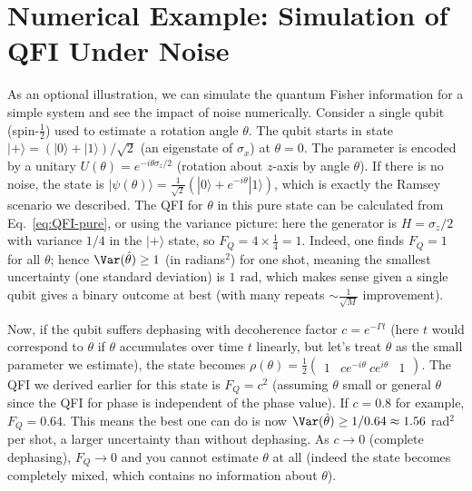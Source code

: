 \section{Numerical Example: Simulation of QFI Under Noise}

\label{sec:numerics}



As an optional illustration, we can simulate the quantum Fisher
information for a simple system and see the impact of noise
numerically. Consider a single qubit (spin-$\frac{1}{2}$) used to
estimate a rotation angle $\theta$. The qubit starts in state
$|+\rangle = (|0\rangle+|1\rangle)/\sqrt{2}$ (an eigenstate of
$\sigma_x$) at $\theta=0$. The parameter is encoded by a unitary
$U(\theta) = e^{-i \theta \sigma_z/2}$ (rotation about $z$-axis by
angle $\theta$). If there is no noise, the state is
$|\psi(\theta)\rangle = \frac{1}{\sqrt{2}}(|0\rangle +
e^{-i\theta}|1\rangle)$, which is exactly the Ramsey scenario we
described. The QFI for $\theta$ in this pure state can be calculated
from Eq.~\eqref{eq:QFI-pure}, or using the variance picture: here the
generator is $H=\sigma_z/2$ with variance $1/4$ in the $|+\rangle$
state, so $F_Q = 4 \times \frac{1}{4} = 1$. Indeed, one finds $F_Q =
1$ for all $\theta$; hence $\Var(\hat{\theta}) \ge 1$ (in radians$^2$)
for one shot, meaning the smallest uncertainty (one standard
deviation) is $1$ rad, which makes sense given a single qubit gives a
binary outcome at best (with many repeats $\sim \frac{1}{\sqrt{M}}$
improvement).



Now, if the qubit suffers dephasing with decoherence factor $c =
e^{-\Gamma t}$ (here $t$ would correspond to $\theta$ if $\theta$
accumulates over time $t$ linearly, but let’s treat $\theta$ as the
small parameter we estimate), the state becomes $\rho(\theta) =
\frac{1}{2}\begin{pmatrix}1 & c e^{-i\theta} \ c e^{i\theta} &
  1\end{pmatrix}$. The QFI we derived earlier for this state is $F_Q =
  c^2$ (assuming $\theta$ small or general $\theta$ since the QFI for
  phase is independent of the phase value). If $c=0.8$ for example,
  $F_Q = 0.64$. This means the best one can do is now
  $\Var(\hat{\theta}) \ge 1/0.64 \approx 1.56$ rad$^2$ per shot, a
  larger uncertainty than without dephasing. As $c \to 0$ (complete
  dephasing), $F_Q \to 0$ and you cannot estimate $\theta$ at all
  (indeed the state becomes completely mixed, which contains no
  information about $\theta$).



